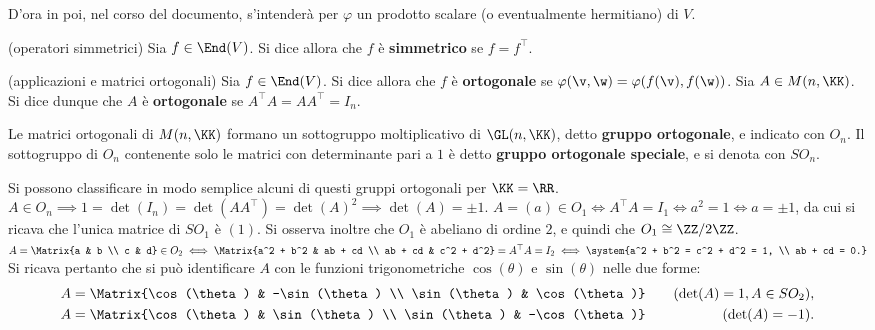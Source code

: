 \documentclass[11pt]{article}
\begin{document}
	\begin{note}
		D'ora in poi, nel corso del documento, s'intenderà per $\varphi$ un prodotto scalare (o eventualmente hermitiano) di $V$.
	\end{note}

	\begin{definition} (operatori simmetrici)
		Sia $f \in \End(V)$. Si dice allora che $f$ è \textbf{simmetrico} se $f = f^\top$.
	\end{definition}

	\begin{definition} (applicazioni e matrici ortogonali)
		Sia $f \in \End(V)$. Si dice allora che $f$ è \textbf{ortogonale} se $\varphi(\v, \w) = \varphi(f(\v), f(\w))$.
		Sia $A \in M(n, \KK)$. Si dice dunque che $A$ è \textbf{ortogonale} se $A^\top A = A A^\top = I_n$.
	\end{definition}

	\begin{definition}
		Le matrici ortogonali di $M(n, \KK)$ formano un sottogruppo moltiplicativo di $\GL(n, \KK)$, detto \textbf{gruppo ortogonale},
		e indicato con $O_n$. Il sottogruppo di $O_n$ contenente solo le matrici con determinante pari a $1$ è
		detto \textbf{gruppo ortogonale speciale}, e si denota con $SO_n$.
	\end{definition}

	\begin{remark}
		Si possono classificare in modo semplice alcuni di questi gruppi ortogonali per $\KK = \RR$. \\
		
		\li $A \in O_n \implies 1 = \det(I_n) = \det(A A^\top) = \det(A)^2 \implies \det(A) = \pm 1$.
		\li $A = (a) \in O_1 \iff A^\top A = I_1 \iff a^2 = 1 \iff a = \pm 1$, da cui si ricava che l'unica matrice
		di $SO_1$ è $(1)$. Si osserva inoltre che $O_1$ è abeliano di ordine $2$, e quindi che $O_1 \cong \ZZ/2\ZZ$. \\
		\li $A = \Matrix{a & b \\ c & d} \in O_2 \iff \Matrix{a^2 + b^2 & ab + cd \\ ab + cd & c^2 + d^2} = A^\top A = I_2 \iff \system{a^2 + b^2 = c^2 + d^2 = 1, \\ ab + cd = 0.}$ \\
		
		Si ricava pertanto che si può identificare
		$A$ con le funzioni trigonometriche $\cos(\theta)$ e $\sin(\theta)$ nelle due forme:
		\begin{align*}
			&A = \Matrix{\cos(\theta) & -\sin(\theta) \\ \sin(\theta) & \cos(\theta)} \quad &\text{(}\!\det(A) = 1, A \in SO_2\text{)}, \\
			&A = \Matrix{\cos(\theta) & \sin(\theta) \\ \sin(\theta) & -\cos(\theta)} \quad &\text{(}\!\det(A) = -1\text{)}.
		\end{align*}
	\end{remark}
\end{document}
